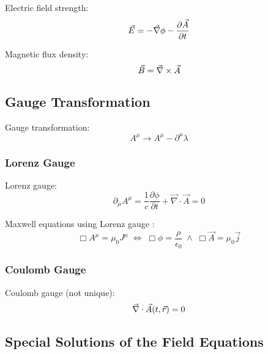		\noindent
		Electric field strength:
		\begin{equation}
			\vec{E} = -\vec{\nabla}\phi-\frac{\partial \vec{A}}{\partial t}
		\end{equation}

		\noindent
		Magnetic flux density:
		\begin{equation}
			\vec{B} = \vec{\nabla}\times\vec{A}
		\end{equation}

	\subsection{Gauge Transformation}
		\noindent
		Gauge transformation:
		\begin{equation}
			A^\mu \rightarrow A^\mu-\partial^\mu \lambda
		\end{equation}

		\subsubsection{Lorenz Gauge}
			\noindent
			Lorenz gauge:
			\begin{equation}
				\partial_\mu A^\mu = \frac{1}{c}\frac{\partial \phi}{\partial t} + \vec{\nabla}\cdot\vec{A} = 0
			\end{equation}

			\noindent
			Maxwell equations using Lorenz gauge :
			\begin{equation}
				\Box A^\mu = \mu_0 J^\mu \;\Leftrightarrow\;
				\Box \phi = \dfrac{\rho}{\epsilon_0} \;\wedge\;
				\Box \vec{A} = \mu_0 \vec{j}
			\end{equation}

		\subsubsection{Coulomb Gauge }
			\noindent
			Coulomb gauge (not unique):
			\begin{equation}
				\vec{\nabla}\cdot\vec{A}(t,\vec{r})=0
			\end{equation}

	\subsection{Special Solutions of the Field Equations}
